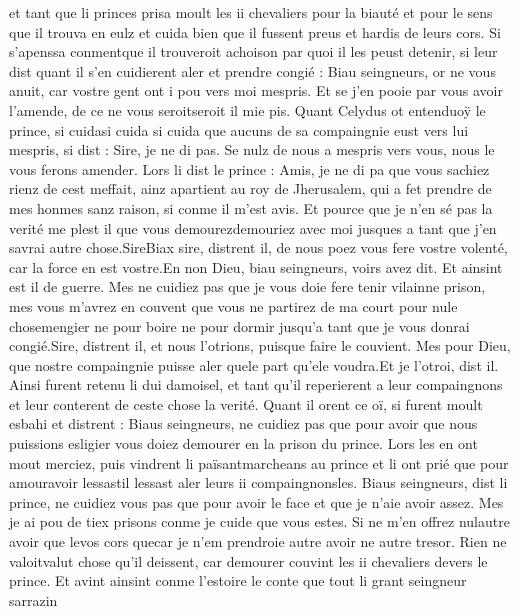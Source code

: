\documentclass{article}
\begin{document}
\begin{pages}
   et tant que li princes prisa moult les ii chevaliers pour la biauté et pour le sens 
   que il trouva en eulz et cuida bien que il fussent preus et hardis de leurs cors. Si s’apenssa 
   conmentque il trouveroit achoison par 
      quoi il les peust detenir, si leur dist quant il s’en cuidierent aler et prendre congié :
   Biau seingneurs, or ne vous anuit, car vostre gent ont i pou vers moi mespris. Et se j’en 
      pooie par vous avoir l’amende, de ce ne vous seroitseroit il mie pis.
   Quant Celydus ot entenduoÿ 
   le prince, si cuidasi cuida si cuida 
   que aucuns de sa compaingnie eust vers lui mespris, si dist :
   Sire, je ne di pas. Se nulz de nous a mespris vers vous, nous le vous ferons amender.
   Lors li dist le prince :
   Amis, je ne di pa que vous sachiez rienz de cest meffait, 
   ainz apartient au roy de Jherusalem, 
   qui a fet prendre de mes honmes sanz raison, si conme il m’est avis. Et pource que je n’en sé pas la verité me plest il que vous 
      demourezdemouriez avec moi jusques a tant que j’en savrai autre chose.SireBiax sire, distrent il, 
      de nous poez vous fere vostre volenté, car la force en est vostre.En non Dieu, biau seingneurs, voirs avez dit. Et ainsint est il de guerre. Mes ne cuidiez pas que je 
      vous doie fere tenir vilainne prison, mes vous m’avrez en couvent que vous 
      ne partirez de ma court pour nule chosemengier ne pour boire ne pour dormir 
      jusqu’a tant que je vous donrai congié.Sire, distrent il, et nous l’otrions, puisque faire le couvient. 
   Mes pour Dieu, que nostre compaingnie puisse aler quele part qu’ele voudra.Et je l’otroi, dist il. \pend 
\pstart Ainsi furent retenu li dui damoisel, et tant qu’il reperierent a leur compaingnons 
   et leur conterent de ceste chose la verité. Quant il orent ce oï, si furent moult esbahi 
   et distrent :
   Biaus seingneurs, ne cuidiez pas que pour avoir que nous puissions esligier 
      vous doiez demourer en la prison du prince.
   Lors les en ont mout merciez, puis vindrent li 
   païsantmarcheans au 
   prince et li ont prié que pour 
      amouravoir 
      lessastil lessast 
      aler leurs ii compaingnonsles.
   Biaus seingneurs, dist li prince, ne cuidiez 
      vous pas 
      que pour avoir le face et que 
      je n’aie avoir assez. Mes je ai pou de tiex prisons conme je cuide que vous 
      estes. Si ne m’en offrez nulautre avoir que 
      levos cors 
      quecar je n’em prendroie autre avoir ne autre tresor.
   Rien ne valoitvalut chose qu’il deissent, car demourer couvint les ii 
   chevaliers devers le prince. 
   Et avint ainsint conme l’estoire le conte que tout li grant seingneur sarrazin 

\end{pages}
\end{document}
